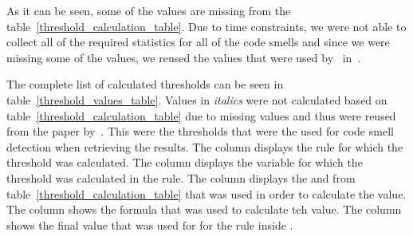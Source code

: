 As it can be seen, some of the values are missing from the table~\ref{threshold_calculation_table}.
Due to time constraints, we were not able to collect all of the required statistics for all of the code smells
and since we were missing some of the values, we reused the values that were used by~\citeauthor{ios_code_smell_paper} in~\cite{ios_code_smell_paper}.

The complete list of calculated thresholds can be seen in table~\ref{threshold_values_table}.
Values in \textit{italics} were not calculated based on table~\ref{threshold_calculation_table} due to missing values
and thus were reused from the paper by~\cite{ios_code_smell_paper}.
This were the thresholds that were the used for code smell detection when retrieving the results.
The column  displays the rule for which the threshold was calculated.
The column  displays the variable for which the threshold was calculated in the rule.
The column  displays the  and  from table~\ref{threshold_calculation_table}
that was used in order to calculate the value.
The column  shows the formula that was used to calculate teh value.
The column  shows the final value that was used for  for the rule inside .


